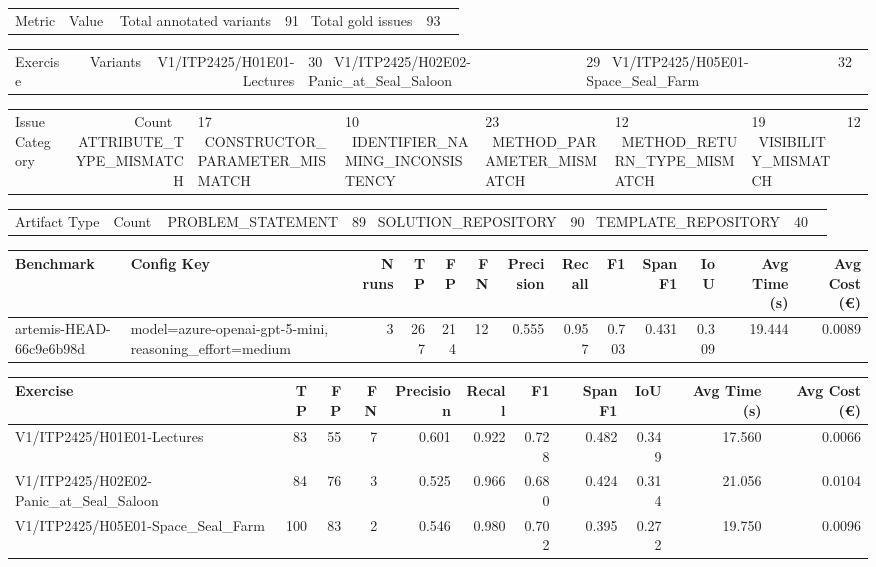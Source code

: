 \begin{tabular}{lr}
Metric & Value \
\hline
Total annotated variants & 91 \
Total gold issues & 93 \
\end{tabular}

\begin{tabular}{lr}
Exercise & Variants \
\hline
V1/ITP2425/H01E01-Lectures & 30 \
V1/ITP2425/H02E02-Panic\_at\_Seal\_Saloon & 29 \
V1/ITP2425/H05E01-Space\_Seal\_Farm & 32 \
\end{tabular}

\begin{tabular}{lr}
Issue Category & Count \
\hline
ATTRIBUTE\_TYPE\_MISMATCH & 17 \
CONSTRUCTOR\_PARAMETER\_MISMATCH & 10 \
IDENTIFIER\_NAMING\_INCONSISTENCY & 23 \
METHOD\_PARAMETER\_MISMATCH & 12 \
METHOD\_RETURN\_TYPE\_MISMATCH & 19 \
VISIBILITY\_MISMATCH & 12 \
\end{tabular}

\begin{tabular}{lr}
Artifact Type & Count \
\hline
PROBLEM\_STATEMENT & 89 \
SOLUTION\_REPOSITORY & 90 \
TEMPLATE\_REPOSITORY & 40 \
\end{tabular}

\begin{tabular}{llrrrrrrrrrrr}
Benchmark & Config Key & N runs & TP & FP & FN & Precision & Recall & F1 & Span F1 & IoU & Avg Time (s) & Avg Cost (€) \\
\hline
artemis-HEAD-66c9e6b98d & model=azure-openai-gpt-5-mini, reasoning\_effort=medium & 3 & 267 & 214 & 12 & 0.555 & 0.957 & 0.703 & 0.431 & 0.309 & 19.444 & 0.0089 \\
\end{tabular}

\begin{tabular}{lrrrrrrrrrr}
Exercise & TP & FP & FN & Precision & Recall & F1 & Span F1 & IoU & Avg Time (s) & Avg Cost (€) \\
\hline
V1/ITP2425/H01E01-Lectures & 83 & 55 & 7 & 0.601 & 0.922 & 0.728 & 0.482 & 0.349 & 17.560 & 0.0066 \\
V1/ITP2425/H02E02-Panic\_at\_Seal\_Saloon & 84 & 76 & 3 & 0.525 & 0.966 & 0.680 & 0.424 & 0.314 & 21.056 & 0.0104 \\
V1/ITP2425/H05E01-Space\_Seal\_Farm & 100 & 83 & 2 & 0.546 & 0.980 & 0.702 & 0.395 & 0.272 & 19.750 & 0.0096 \\
\end{tabular}
